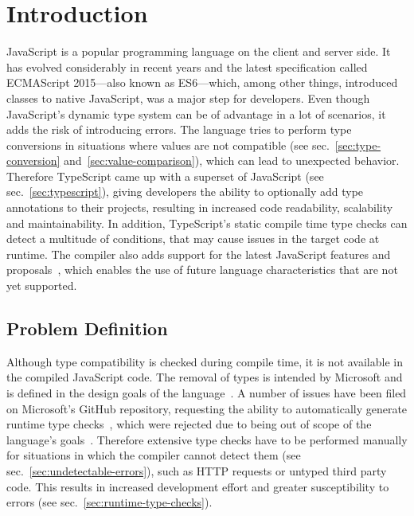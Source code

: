 \chapter{Introduction}
\label{cha:introduction}

JavaScript is a popular programming language on the client and server side. It has evolved considerably in recent years and the latest specification called ECMAScript 2015---also known as ES6---which, among other things, introduced classes to native JavaScript, was a major step for developers. Even though JavaScript's dynamic type system can be of advantage in a lot of scenarios, it adds the risk of introducing errors. The language tries to perform type conversions in situations where values are not compatible (see sec.~\ref{sec:type-conversion} and~\ref{sec:value-comparison}), which can lead to unexpected behavior. Therefore TypeScript came up with a superset of JavaScript (see sec.~\ref{sec:typescript}), giving developers the ability to optionally add type annotations to their projects, resulting in increased code readability, scalability and maintainability. In addition, TypeScript's static compile time type checks can detect a multitude of conditions, that may cause issues in the target code at runtime. The compiler also adds support for the latest JavaScript features and proposals~\cites{TypeScriptHandbook:CompilerOptions, TypeScriptWebsite}, which enables the use of future language characteristics that are not yet supported.

\section{Problem Definition}
\label{sec:problem-definition}

Although type compatibility is checked during compile time, it is not available in the compiled JavaScript code. The removal of types is intended by Microsoft and is defined in the design goals of the language~\cite{TypeScriptWiki:DesignGoals}. A number of issues have been filed on Microsoft's GitHub repository, requesting the ability to automatically generate runtime type checks~\cites{TypeScriptIssue:RuntimeTypeChecking, TypeScriptIssue:RuntimeTypeChecks, TypeScriptIssue:EmitTypeArguments}, which were rejected due to being out of scope of the language's goals~\cites{TypeScriptIssue:RuntimeTypeChecking:Comment:OutOfScope, TypeScriptIssue:EmitTypeArguments:Comment:OutOfScope}. Therefore extensive type checks have to be performed manually for situations in which the compiler cannot detect them (see sec.~\ref{sec:undetectable-errors}), such as HTTP requests or untyped third party code. This results in increased development effort and greater susceptibility to errors (see sec.~\ref{sec:runtime-type-checks}).

